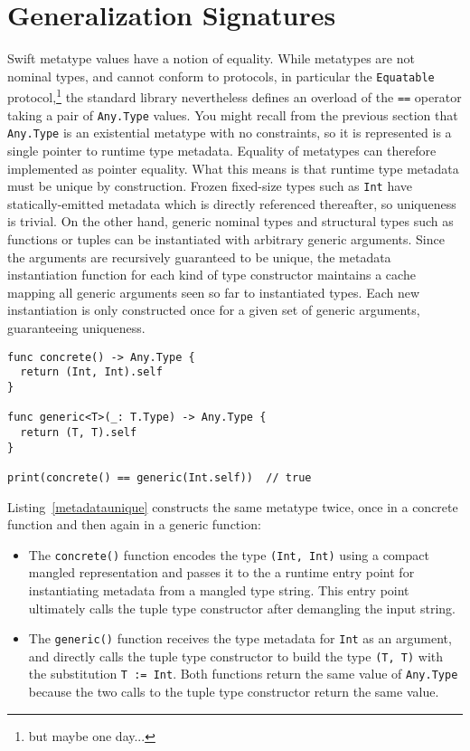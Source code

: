 \documentclass[a4paper,headsepline,bibliography=totoc,toc=flat,fleqn,twoside=semi]{scrbook}
\theoremstyle{definition}
\theoremstyle{definition}
\theoremstyle{definition}
\begin{document}
\section{Generalization Signatures}

Swift metatype values have a notion of equality. While metatypes are not nominal types, and cannot conform to protocols, in particular the \texttt{Equatable} protocol,\footnote{but maybe one day...} the standard library nevertheless defines an overload of the \texttt{==} operator taking a pair of \texttt{Any.Type} values. You might recall from the previous section that \texttt{Any.Type} is an existential metatype with no constraints, so it is represented is a single pointer to runtime type metadata. Equality of metatypes can therefore implemented as pointer equality. What this means is that runtime type metadata must be unique by construction. Frozen fixed-size types such as \texttt{Int} have statically-emitted metadata which is directly referenced thereafter, so uniqueness is trivial. On the other hand, generic nominal types and structural types such as functions or tuples can be instantiated with arbitrary generic arguments. Since the arguments are recursively guaranteed to be unique, the metadata instantiation function for each kind of type constructor maintains a cache mapping all generic arguments seen so far to instantiated types. Each new instantiation is only constructed once for a given set of generic arguments, guaranteeing uniqueness.

\begin{listing}\label{metadataunique}
\begin{Verbatim}
func concrete() -> Any.Type {
  return (Int, Int).self
}

func generic<T>(_: T.Type) -> Any.Type {
  return (T, T).self
}

print(concrete() == generic(Int.self))  // true
\end{Verbatim}
\end{listing}
Listing~\ref{metadataunique} constructs the same metatype twice, once in a concrete function and then again in a generic function:
\begin{itemize}
\item The \texttt{concrete()} function encodes the type \texttt{(Int, Int)} using a compact mangled representation and passes it to the a runtime entry point for instantiating metadata from a mangled type string. This entry point ultimately calls the tuple type constructor after demangling the input string.
\item The \texttt{generic()} function receives the type metadata for \texttt{Int} as an argument, and directly calls the tuple type constructor to build the type \texttt{(T, T)} with the substitution \texttt{T := Int}. Both functions return the same value of \texttt{Any.Type} because the two calls to the tuple type constructor return the same value.
\end{itemize}
\end{document}
